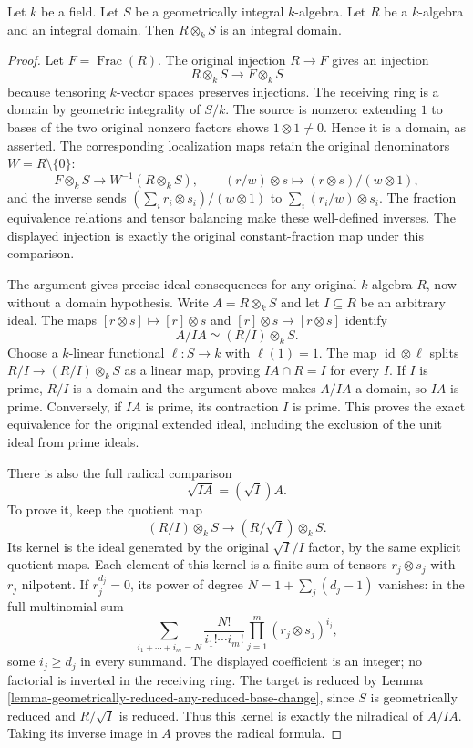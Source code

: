 \begin{lemma}
\label{lemma-geometrically-integral-any-integral-base-change}
Let $k$ be a field. Let $S$ be a geometrically integral $k$-algebra.
Let $R$ be a $k$-algebra and an integral domain. Then $R \otimes_k S$
is an integral domain.
\end{lemma}

\begin{proof}
Let $F=\operatorname{Frac}(R)$.
The original injection $R\to F$
gives an injection
$$
R\otimes_k S\longrightarrow F\otimes_k S
$$
because tensoring $k$-vector spaces
preserves injections. The receiving
ring is a domain by geometric
integrality of $S/k$. The source
is nonzero: extending $1$ to
bases of the two original
nonzero factors shows
$1\otimes1\neq0$. Hence it
is a domain, as asserted.
The corresponding localization
maps retain the original
denominators $W=R\setminus\{0\}$:
$$
F\otimes_k S\longrightarrow W^{-1}(R\otimes_k S),
\qquad(r/w)\otimes s\longmapsto(r\otimes s)/(w\otimes1),
$$
and the inverse sends
$(\sum_i r_i\otimes s_i)/(w\otimes1)$
to $\sum_i(r_i/w)\otimes s_i$.
The fraction equivalence relations
and tensor balancing make these
well-defined inverses. The
displayed injection is exactly
the original constant-fraction
map under this comparison.

The argument gives precise
ideal consequences for any
original $k$-algebra $R$, now
without a domain hypothesis.
Write $A=R\otimes_k S$ and
let $I\subseteq R$ be an
arbitrary ideal. The maps
$[r\otimes s]\mapsto[r]\otimes s$
and $[r]\otimes s\mapsto[r\otimes s]$
identify
$$
A/IA\simeq(R/I)\otimes_k S.
$$
Choose a $k$-linear functional
$\ell:S\to k$ with $\ell(1)=1$.
The map $\operatorname{id}\otimes\ell$
splits $R/I\to(R/I)\otimes_k S$
as a linear map, proving
$IA\cap R=I$ for every $I$.
If $I$ is prime, $R/I$ is
a domain and the argument
above makes $A/IA$ a domain,
so $IA$ is prime. Conversely,
if $IA$ is prime, its
contraction $I$ is prime.
This proves the exact equivalence
for the original extended ideal,
including the exclusion of
the unit ideal from prime ideals.

There is also the full radical
comparison
$$
\sqrt{IA}=(\sqrt I)A.
$$
To prove it, keep the quotient
map
$$
(R/I)\otimes_k S\longrightarrow(R/\sqrt I)\otimes_k S.
$$
Its kernel is the ideal
generated by the original
$\sqrt I/I$ factor, by the
same explicit quotient maps.
Each element of this kernel
is a finite sum of tensors
$r_j\otimes s_j$ with $r_j$
nilpotent. If $r_j^{d_j}=0$,
its power of degree
$N=1+\sum_j(d_j-1)$ vanishes:
in the full multinomial sum
$$
\sum_{i_1+\cdots+i_m=N}
\frac{N!}{i_1!\cdots i_m!}
\prod_{j=1}^m(r_j\otimes s_j)^{i_j},
$$
some $i_j\geq d_j$ in every
summand. The displayed coefficient
is an integer; no factorial
is inverted in the receiving ring.
The target is reduced by Lemma
\ref{lemma-geometrically-reduced-any-reduced-base-change},
since $S$ is geometrically reduced
and $R/\sqrt I$ is reduced.
Thus this kernel is exactly
the nilradical of $A/IA$.
Taking its inverse image in
$A$ proves the radical formula.


\end{proof}
